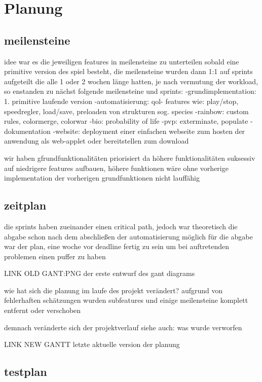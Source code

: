 \documentclass[12pt]{article}
\theoremstyle{plain}
\begin{document}
\section{Planung}

\subsection{meilensteine}
idee war es die jeweiligen features in meilensteine zu unterteilen sobald eine primitive version des spiel besteht, die meilensteine wurden dann 1:1 auf sprints aufgeteilt die alle 1 oder 2 wochen länge hatten,
je nach vermutung der workload, so enstanden zu nächst folgende meilensteine und sprints:
-grundimplementation: 1. primitive laufende version
-automatisierung: qol- features wie: play/stop, speedregler, load/save, preloaden von strukturen sog. species
-rainbow: custom rules, colormerge, colorwar
-bio: probability of life
-pvp: exterminate, populate
-dokumentation
-website: deployment einer einfachen webseite zum hosten der anwendung als web-applet oder bereitstellen zum download

wir haben gfrundfunktionalitäten priorisiert da höhere funktionalitäten suksessiv auf niedrigere features aufbauen,
höhere funktionen wäre ohne vorherige implementation der vorherigen grundfunktionen nicht lauffähig

\subsection{zeitplan}
die sprints haben zueinander einen critical path, jedoch war theoretisch die abgabe schon nach dem abschließen der automatisierung möglich
für die abgabe war der plan, eine woche vor deadline fertig zu sein um bei auftretenden problemen einen puffer zu haben

LINK OLD GANT:PNG
der erste entwurf des gant diagrams

wie hat sich die planung im laufe des projekt verändert?
aufgrund von fehlerhaften schätzungen wurden subfeatures und einige meilensteine komplett entfernt oder verschoben

demnach veränderte sich der projektverlauf
siehe auch: was wurde verworfen


LINK NEW GANTT
letzte aktuelle version der planung

\subsection{testplan}
\end{document}
